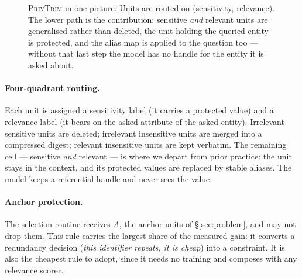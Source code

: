 \documentclass[conference]{IEEEtran}
\newcommand{\ours}{\textsc{PrivTrim}}
\begin{document}
\begin{figure}[t]
\caption{\ours{} in one picture. Units are routed on (sensitivity, relevance). The lower path is
the contribution: sensitive \emph{and} relevant units are generalised rather than deleted, the
unit holding the queried entity is protected, and the alias map is applied to the question
too --- without that last step the model has no handle for the entity it is asked about.}
\label{fig:method}
\end{figure}

\paragraph{Four-quadrant routing.}
Each unit is assigned a sensitivity label (it carries a protected value) and a relevance label
(it bears on the asked attribute of the asked entity). Irrelevant sensitive units are deleted;
irrelevant insensitive units are merged into a compressed digest; relevant insensitive units
are kept verbatim. The remaining cell --- sensitive \emph{and} relevant --- is where we depart
from prior practice: the unit stays in the context, and its protected values are replaced by
stable aliases. The model keeps a referential handle and never sees the value.

\paragraph{Anchor protection.}
The selection routine receives $A$, the anchor units of \S\ref{sec:problem}, and may not drop
them. This rule carries the largest share of the measured gain: it converts a redundancy
decision (\emph{this identifier repeats, it is cheap}) into a constraint. It is also the
cheapest rule to adopt, since it needs no training and composes with any relevance scorer.
\end{document}
